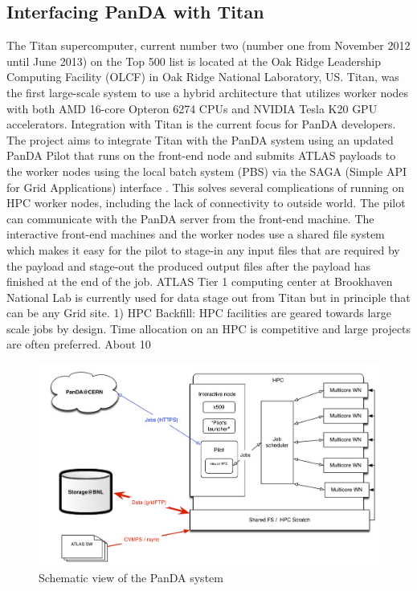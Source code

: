 \documentclass[10pt, conference, compsocconf]{IEEEtran}
\begin{document}
\subsection{Interfacing PanDA with Titan}
The Titan supercomputer, current number two (number one from November 2012 until June 2013) on the Top 500 list is located at the Oak Ridge Leadership Computing  Facility (OLCF) in Oak Ridge National Laboratory, US. Titan, was the first large-scale system to use  a hybrid architecture that utilizes worker nodes with both AMD 16-core Opteron 6274 CPUs and NVIDIA Tesla K20 GPU accelerators.
Integration with Titan is the current focus for PanDA developers. The project aims to integrate Titan with the PanDA system using an updated PanDA Pilot that runs on the front-end node and submits ATLAS payloads to the worker nodes using the local batch system (PBS) via the SAGA (Simple API for Grid Applications) interface \cite{SAGA}. This solves several complications of  running on HPC worker nodes,  including the lack of connectivity to outside world. The pilot can communicate with the PanDA server from the front-end machine. The interactive front-end  machines and the worker nodes  use  a shared  file system  which makes  it  easy  for the pilot to stage-in  any input files that are required by the payload and stage-out the produced output files after the payload has finished at the end of the job. ATLAS Tier 1 computing  center at Brookhaven National Lab is currently  used for data stage out from Titan but in principle  that can be any Grid site.
1) HPC Backfill: HPC facilities are geared towards  large scale jobs by design. Time allocation on an HPC is competitive and large projects are often preferred. About 10%
\begin{figure}
\begin{center}
\includegraphics[width=\columnwidth]{figures/PandaInterfaceWithHPC.png}
\caption{Schematic view of the PanDA system\label{fig:interface}}
\end{center}
\end{figure}
\end{document}
